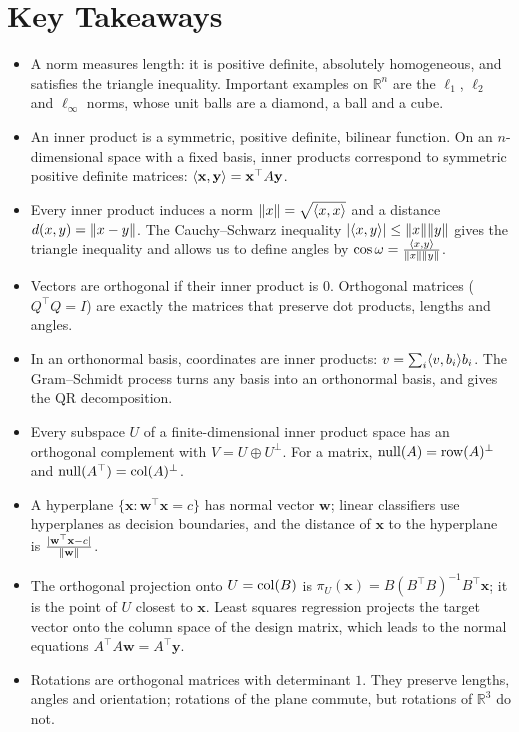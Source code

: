 \section{Key Takeaways}
\begin{itemize}[leftmargin=*]
    \item A norm measures length: it is positive definite, absolutely homogeneous, and satisfies the triangle inequality. Important examples on $\mathbb{R}^n$ are the $\ell_1$, $\ell_2$ and $\ell_\infty$ norms, whose unit balls are a diamond, a ball and a cube.
    \item An inner product is a symmetric, positive definite, bilinear function. On an $n$-dimensional space with a fixed basis, inner products correspond to symmetric positive definite matrices: $\langle \mathbf{x}, \mathbf{y} \rangle = \mathbf{x}^\top A \mathbf{y}$.
    \item Every inner product induces a norm $\lVert x \rVert = \sqrt{\langle x, x \rangle}$ and a distance $d(x, y) = \lVert x - y \rVert$. The Cauchy--Schwarz inequality $|\langle x, y \rangle| \leq \lVert x \rVert\lVert y \rVert$ gives the triangle inequality and allows us to define angles by $\cos\omega = \frac{\langle x, y \rangle}{\lVert x \rVert\lVert y \rVert}$.
    \item Vectors are orthogonal if their inner product is $0$. Orthogonal matrices ($Q^\top Q = I$) are exactly the matrices that preserve dot products, lengths and angles.
    \item In an orthonormal basis, coordinates are inner products: $v = \sum_i \langle v, b_i \rangle b_i$. The Gram--Schmidt process turns any basis into an orthonormal basis, and gives the QR decomposition.
    \item Every subspace $U$ of a finite-dimensional inner product space has an orthogonal complement with $V = U \oplus U^\perp$. For a matrix, $\operatorname{null}(A) = \operatorname{row}(A)^\perp$ and $\operatorname{null}(A^\top) = \operatorname{col}(A)^\perp$.
    \item A hyperplane $\{\mathbf{x} : \mathbf{w}^\top \mathbf{x} = c\}$ has normal vector $\mathbf{w}$; linear classifiers use hyperplanes as decision boundaries, and the distance of $\mathbf{x}$ to the hyperplane is $\frac{|\mathbf{w}^\top \mathbf{x} - c|}{\lVert \mathbf{w} \rVert}$.
    \item The orthogonal projection onto $U = \operatorname{col}(B)$ is $\pi_U(\mathbf{x}) = B(B^\top B)^{-1}B^\top \mathbf{x}$; it is the point of $U$ closest to $\mathbf{x}$. Least squares regression projects the target vector onto the column space of the design matrix, which leads to the normal equations $A^\top A \mathbf{w} = A^\top \mathbf{y}$.
    \item Rotations are orthogonal matrices with determinant $1$. They preserve lengths, angles and orientation; rotations of the plane commute, but rotations of $\mathbb{R}^3$ do not.

\end{itemize}
